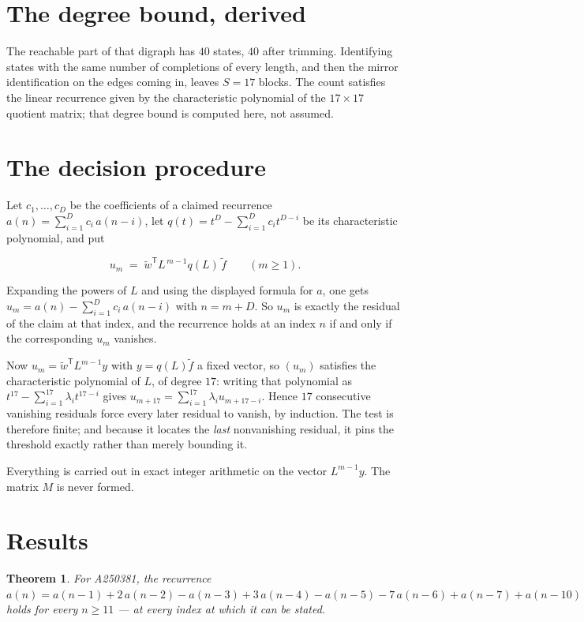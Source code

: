 \documentclass[11pt]{article}
\newtheorem{theorem}{Theorem}
\theoremstyle{definition}
\begin{document}
\section{The degree bound, derived}

The reachable part of that digraph has $40$ states, $40$ after trimming. Identifying states with the same number of completions of every length, and then the mirror identification on the edges coming in, leaves $S = 17$ blocks. The count satisfies the linear recurrence given by the characteristic polynomial of the $17\times17$ quotient matrix; that degree bound is computed here, not assumed.

\section{The decision procedure}

Let $c_1,\dots,c_D$ be the coefficients of a claimed recurrence $a(n) = \sum_{i=1}^{D} c_i\,a(n-i)$, let $q(t) = t^{D} - \sum_{i=1}^{D} c_i t^{D-i}$ be its characteristic polynomial, and put

\[u_m \;=\; \tilde w^{\mathsf T} L^{\,m-1} q(L)\,\tilde f \qquad (m \ge 1).\]

Expanding the powers of $L$ and using the displayed formula for $a$, one gets $u_m = a(n) - \sum_{i=1}^{D} c_i\,a(n-i)$ with $n = m + D$. So $u_m$ is exactly the residual of the claim at that index, and the recurrence holds at an index $n$ if and only if the corresponding $u_m$ vanishes.

Now $u_m = \tilde w^{\mathsf T} L^{m-1} y$ with $y = q(L)\tilde f$ a fixed vector, so $(u_m)$ satisfies the characteristic polynomial of $L$, of degree $17$: writing that polynomial as $t^{17} - \sum_{i=1}^{17} \lambda_i t^{17-i}$ gives $u_{m+17} = \sum_{i=1}^{17} \lambda_i u_{m+17-i}$. Hence $17$ consecutive vanishing residuals force every later residual to vanish, by induction. The test is therefore finite; and because it locates the {\itshape last} nonvanishing residual, it pins the threshold exactly rather than merely bounding it.

Everything is carried out in exact integer arithmetic on the vector $L^{m-1}y$. The matrix $M$ is never formed.

\section{Results}

\begin{theorem} For A250381, the recurrence $a(n) = a(n-1) + 2\,a(n-2) - a(n-3) + 3\,a(n-4) - a(n-5) - 7\,a(n-6) + a(n-7) + a(n-10)$ holds for every $n \ge 11$ --- at every index at which it can be stated.\end{theorem}
\end{document}
